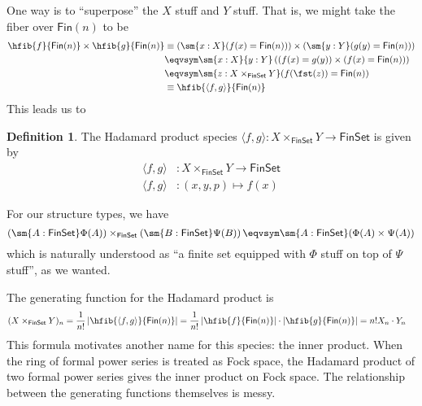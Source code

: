\documentclass[fleqn]{article}
\newcommand{\fin}{\mathsf{Fin}}
\newcommand{\finset}{\mathsf{FinSet}}
\newcommand{\abs}[1]{\left\lvert #1 \right\rvert}
\theoremstyle{theorem}
\theoremstyle{definition}
\newtheorem{defn}{Definition}[section]
\begin{document}
One way is to ``superpose'' the
$X$ stuff and $Y$ stuff.  That is, we might take the fiber over $\fin(n)$ to be
\begin{align*}
  \hfib{f}{\fin(n)} \times \hfib{g}{\fin(n)}
  &\equiv
  \left(\sm{x : X}(f(x) = \fin(n))\right)
  \times
  \left(\sm{y : Y}(g(y) = \fin(n))\right)
  \\&\eqvsym
  \sm{x : X}{y : Y}\left(
    (f(x) = g(y))
    \times
    (f(x) = \fin(n))
  \right)
  \\&\eqvsym
  \sm{z : X \times_{\finset} Y} (f(\fst(z)) = \fin(n))
  \\&\equiv
  \hfib{\langle f, g \rangle}{\fin(n)}
\end{align*}
This leads us to
\begin{defn}
  The Hadamard product species $\langle f, g \rangle : X \times_{\finset} Y \to
  \finset$ is given by
  \begin{align*}
    \langle f, g \rangle &: X \times_{\finset} Y \to
    \finset \\
    \langle f, g \rangle &: (x, y, p) \mapsto f(x) 
  \end{align*}
\end{defn}
\noindent
For our structure types, we have
\[
  \left(\sm{A:\finset}\Phi(A)\right)
  \times_{\finset}
  \left(\sm{B:\finset}\Psi(B)\right)
  \eqvsym
  \sm{A:\finset}(\Phi(A) \times \Psi(A))
\]
which is naturally understood as ``a finite set equipped with $\Phi$ stuff on
top of $\Psi$ stuff'', as we wanted.

The generating function for the Hadamard product is
\begin{align*}
  (X \times_{\finset} Y)_{n}
  &=
  \frac{1}{n!}\abs{\hfib{\langle f, g \rangle}{\fin(n)}}
  =
  \frac{1}{n!}\abs{\hfib{f}{\fin(n)}} \cdot \abs{\hfib{g}{\fin(n)}}
  =
  n! X_{n} \cdot Y_{n}
\end{align*}
This formula motivates another name for this species: the inner product.  When
the ring of formal power series is treated as Fock space, the Hadamard product
of two formal power series gives the inner product on Fock space.  The
relationship between the generating functions themselves is messy.
\end{document}
